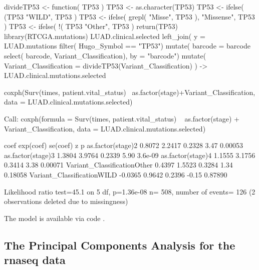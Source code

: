 \begin{Schunk}
\begin{Sinput}
divideTP53 <- function( TP53 ){
   TP53 <- as.character(TP53)
   TP53 <- ifelse( (TP53  %
                   "WILD", 
                   TP53 )
   TP53 <- ifelse( grepl( "Misse", TP53 ), 
                   "Missense", 
                   TP53 )
   TP53 <- ifelse( !( TP53 %
                   "Other",
                   TP53 )
   return(TP53)
}
library(RTCGA.mutations)
LUAD.clinical.selected %
      left_join( y = LUAD.mutations %
                    filter( Hugo_Symbol == "TP53") %
                    mutate( barcode = barcode %
                    select( barcode, Variant_Classification),
                 by = "barcode") %
                    mutate( Variant_Classification = divideTP53(Variant_Classification) ) ->
   LUAD.clinical.mutations.selected

      coxph(Surv(times, patient.vital_status)~ as.factor(stage)+Variant_Classification,
            data = LUAD.clinical.mutations.selected)
\end{Sinput}
\begin{Soutput}
Call:
coxph(formula = Surv(times, patient.vital_status) ~ as.factor(stage) + 
    Variant_Classification, data = LUAD.clinical.mutations.selected)


                               coef exp(coef) se(coef)     z       p
as.factor(stage)2            0.8072    2.2417   0.2328  3.47 0.00053
as.factor(stage)3            1.3804    3.9764   0.2339  5.90 3.6e-09
as.factor(stage)4            1.1555    3.1756   0.3414  3.38 0.00071
Variant_ClassificationOther  0.4397    1.5523   0.3284  1.34 0.18058
Variant_ClassificationWILD  -0.0365    0.9642   0.2396 -0.15 0.87890

Likelihood ratio test=45.1  on 5 df, p=1.36e-08
n= 508, number of events= 126 
   (2 observations deleted due to missingness)
\end{Soutput}
\end{Schunk}

The model is available via code .

\newpage

\subsection{The Principal Components Analysis for the rnaseq
data}\label{the-principal-components-analysis-for-the-rnaseq-data}

